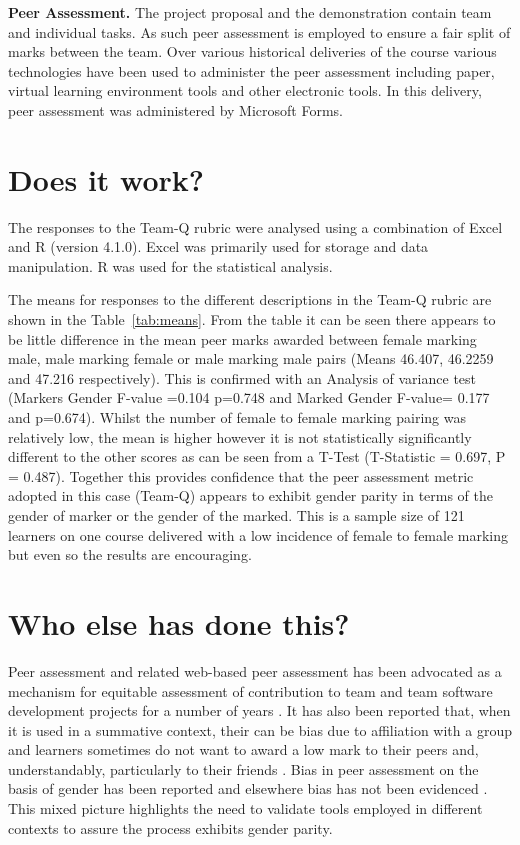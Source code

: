 \documentclass[sigconf, anonymous=true]{acmart}
\begin{document}
\textbf{Peer Assessment.}
The project proposal and the demonstration contain team and individual tasks. As such peer assessment is employed to ensure a fair split of marks between the team. Over various historical deliveries of the course various technologies have been used to administer the peer assessment including paper, virtual learning environment tools and other electronic tools. In this delivery, peer assessment was administered by Microsoft Forms. 
\section{Does it work?}	
The responses to the Team-Q rubric were analysed using a combination of Excel and R (version 4.1.0). Excel was primarily used for storage and data manipulation. R was used for the statistical analysis. 

The means for responses to the different descriptions in the Team-Q rubric are shown in the Table~\ref{tab:means}. From the table it can be seen there appears to be little difference in the mean peer marks awarded between female marking male, male marking female or male marking male pairs (Means 46.407, 46.2259 and 47.216 respectively). This is confirmed with an Analysis of variance test (Markers Gender F-value =0.104 p=0.748 and Marked Gender F-value= 0.177 and p=0.674). Whilst the number of female to female marking pairing was relatively low, the mean is higher however it is not statistically significantly different to the other scores as can be seen from a T-Test (T-Statistic = 0.697, P = 0.487). Together this provides confidence that the peer assessment metric adopted in this case (Team-Q) appears to exhibit gender parity in terms of the gender of marker or the gender of the marked. This is a sample size of 121 learners on one course delivered with a low incidence of female to female marking but even so the results are encouraging.


\section{Who else has done this?}
Peer assessment and related web-based peer assessment has been advocated as a mechanism for equitable assessment of contribution to team and team software development projects for a number of years \cite{Clark2005,Raban_Litchfield_2007, Gordon2010,Fagerholm, Britton2017,Philips21}. It has also been reported that, when it is used in a summative context, their can be bias due to affiliation with a group \cite{Cestone2008} and learners sometimes do not want to award a low mark to their peers and, understandably, particularly to their friends \cite{Sridharam2003}.  Bias in peer assessment on the basis of gender has been reported \cite{Heels2019,Stonewall2018} and elsewhere bias has not been evidenced \cite{Tucker2014,Falchikov1997}. This mixed picture highlights the need to validate tools employed in different contexts to assure the process exhibits gender parity.
\end{document}
